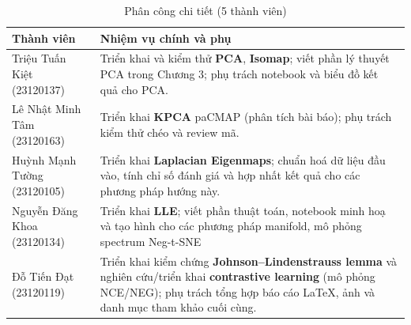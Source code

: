 \begin{table}[H]
\centering
\caption{Phân công chi tiết (5 thành viên)}
\label{tab:phan-cong}
\begin{tabular}{|p{}|p{}|}
\hline
\textbf{Thành viên} & \textbf{Nhiệm vụ chính và phụ} \\
\hline
Triệu Tuấn Kiệt (23120137) & Triển khai và kiểm thử \textbf{PCA}, \textbf{Isomap}; viết phần lý thuyết PCA trong Chương 3; phụ trách notebook và biểu đồ kết quả cho PCA. \\
\hline
Lê Nhật Minh Tâm (23120163) & Triển khai \textbf{KPCA} paCMAP (phân tích bài báo); phụ trách kiểm thử chéo và review mã. \\
\hline
Huỳnh Mạnh Tường (23120105) & Triển khai \textbf{Laplacian Eigenmaps}; chuẩn hoá dữ liệu đầu vào, tính chỉ số đánh giá và hợp nhất kết quả cho các phương pháp hướng này. \\
\hline
Nguyễn Đăng Khoa (23120134) & Triển khai \textbf{LLE}; viết phần thuật toán, notebook minh hoạ và tạo hình cho các phương pháp manifold, mô phỏng spectrum Neg-t-SNE \\
\hline
Đỗ Tiến Đạt (23120119) & Triển khai kiểm chứng \textbf{Johnson--Lindenstrauss lemma} và nghiên cứu/triển khai \textbf{contrastive learning} (mô phỏng NCE/NEG); phụ trách tổng hợp báo cáo LaTeX, ảnh và danh mục tham khảo cuối cùng. \\
\hline
\end{tabular}
\end{table}
